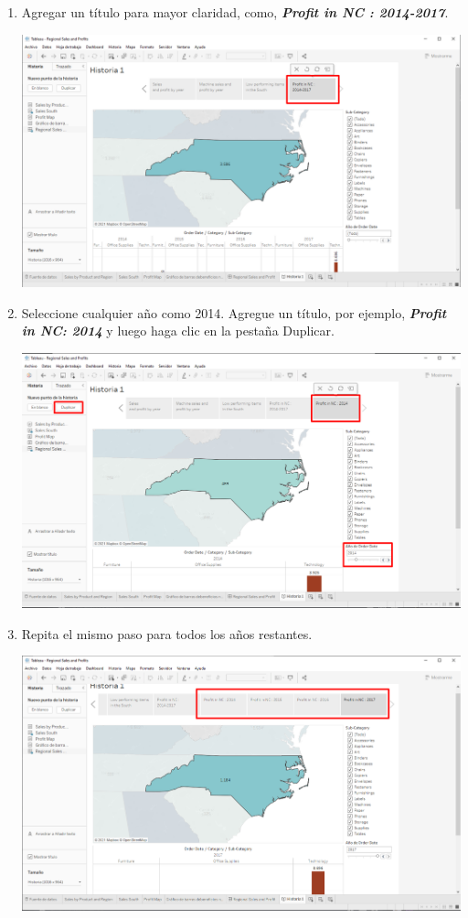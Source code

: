 \documentclass[12pt,letterpaper]{article}
\begin{document}
\begin{enumerate}
\begin{center}
        \end{center}
        \item Agregar un título para mayor claridad, como, \textit{\textbf{Profit in NC : 2014-2017}}.
        \begin{center}
            \includegraphics[width=15cm]{./img/img98.png}
        \end{center}
        \item Seleccione cualquier año como 2014. Agregue un título, por ejemplo, \textit{\textbf{Profit in NC: 2014}} y luego haga clic en la pestaña Duplicar.
        \begin{center}
            \includegraphics[width=15cm]{./img/img99.png}
        \end{center}
        \item Repita el mismo paso para todos los años restantes.
        \begin{center}
            \includegraphics[width=15cm]{./img/img100.png}

\end{center}
\end{enumerate}
\end{document}
